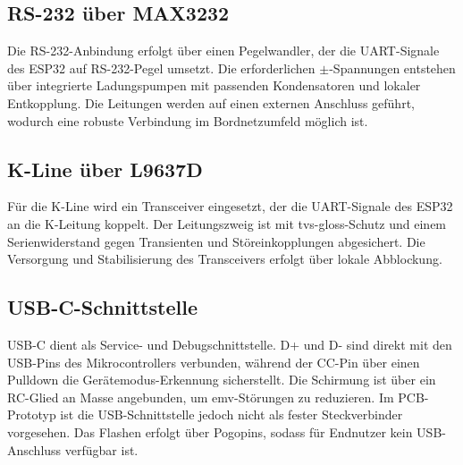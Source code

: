 \subsection{RS-232 über MAX3232}
Die RS-232-Anbindung erfolgt über einen Pegelwandler, der die UART-Signale des ESP32 auf RS-232-Pegel umsetzt. Die erforderlichen $\pm$-Spannungen entstehen über integrierte Ladungspumpen mit passenden Kondensatoren und lokaler Entkopplung. Die Leitungen werden auf einen externen Anschluss geführt, wodurch eine robuste Verbindung im Bordnetzumfeld möglich ist.

\subsection{K-Line über L9637D}
Für die K-Line wird ein Transceiver eingesetzt, der die UART-Signale des ESP32 an die K-Leitung koppelt. Der Leitungszweig ist mit \gls{tvs-gloss}-Schutz und einem Serienwiderstand gegen Transienten und Störeinkopplungen abgesichert. Die Versorgung und Stabilisierung des Transceivers erfolgt über lokale Abblockung.

\subsection{USB-C-Schnittstelle}
USB-C dient als Service- und Debugschnittstelle. D+ und D- sind direkt mit den USB-Pins des Mikrocontrollers verbunden, während der CC-Pin über einen Pulldown die Gerätemodus-Erkennung sicherstellt. Die Schirmung ist über ein RC-Glied an Masse angebunden, um \gls{emv}-Störungen zu reduzieren. Im PCB-Prototyp ist die USB-Schnittstelle jedoch nicht als fester Steckverbinder vorgesehen. Das Flashen erfolgt über Pogopins, sodass für Endnutzer kein USB-Anschluss verfügbar ist.

